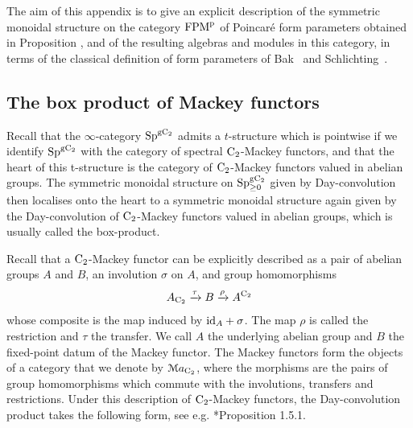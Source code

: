 



The aim of this appendix is to give an explicit description of the symmetric monoidal structure on the category $\mathrm {FPM}^{\mathrm p}$ of Poincar\'e form parameters obtained in Proposition , and of the resulting algebras and modules in this category, in terms of the classical definition of form parameters of Bak~\cite{bak-form-parameter} and  Schlichting~\cite{SchlichtinghigherI}.

\subsection{The box product of Mackey functors}

Recall that the $\infty$-category $\mathrm{Sp}^{{\mathrm{g}\mathrm{C_2}}}$ admits a $t$-structure which is pointwise if we identify $\mathrm{Sp}^{{\mathrm{g}\mathrm{C_2}}}$ with the category of spectral $\mathrm{C_2}$-Mackey functors, and that the heart of this t-structure is the category of  $\mathrm{C_2}$-Mackey functors valued in abelian groups. The symmetric monoidal structure on $\mathrm{Sp}^{{\mathrm{g}\mathrm{C_2}}}_{\geq 0}$ given by Day-convolution then localises onto the heart to a symmetric monoidal structure again given by the Day-convolution of $\mathrm{C_2}$-Mackey functors valued in abelian groups, which is usually called the box-product. 

Recall that a $\mathrm{C_2}$-Mackey functor can be explicitly described as a pair of abelian groups $A$ and $B$, an involution $\sigma$ on $A$, and group homomorphisms
\[
A_{\mathrm{C_2}}\xrightarrow{\tau}B\xrightarrow{\rho}A^{\mathrm{C_2}}
\]
whose composite is the map induced by $\mathrm{id}_A+\sigma$. The map $\rho$ is called the restriction and $\tau$ the transfer. We call $A$ the underlying abelian group and $B$ the fixed-point datum of the Mackey functor. The Mackey functors form the objects of a category that we denote by $\mathcal{M}a_{\mathrm{C_2}}$, where the morphisms are the pairs of group homomorphisms which commute with the involutions, transfers and restrictions.  Under this description of  $\mathrm{C_2}$-Mackey functors, the Day-convolution product takes the following form, see e.g. \cite{Bouc}*{Proposition 1.5.1}.



